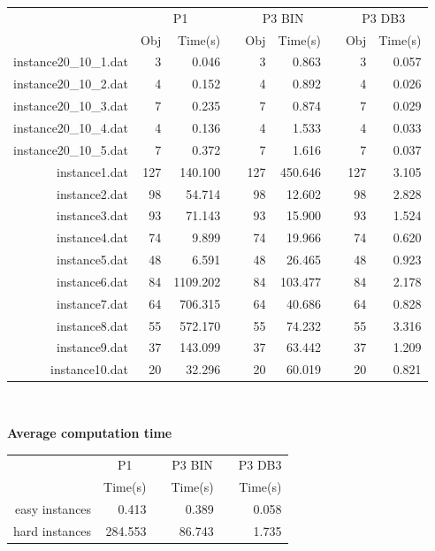 \newpage
\begin{table}[h!]\centering
{}
\begin{tabular}{@{}rrrcrrcrr@{}}\toprule
& \multicolumn{2}{c}{P1} & \phantom{abc} & \multicolumn{2}{c}{P3 BIN} & \phantom{abc} & \multicolumn{2}{c}{P3 DB3}\\
\cmidrule{2-3} \cmidrule{5-6} \cmidrule{8-9}
& Obj & Time(s) & & Obj & Time(s) & & Obj & Time(s)\\ \midrule
instance20\_10\_1.dat & 3 & 0.046 & & 3 & 0.863 & & 3 & 0.057 \\
instance20\_10\_2.dat & 4 & 0.152 & & 4 & 0.892 & & 4 & 0.026 \\
instance20\_10\_3.dat & 7 & 0.235 & & 7 & 0.874 & & 7 & 0.029 \\
instance20\_10\_4.dat & 4 & 0.136 & & 4 & 1.533 & & 4 & 0.033 \\
instance20\_10\_5.dat & 7 & 0.372 & & 7 & 1.616 & & 7 & 0.037 \\
instance1.dat & 127 & 140.100 & & 127 & 450.646 & & 127 & 3.105 \\
instance2.dat & 98 & 54.714 & & 98 & 12.602 & & 98 & 2.828 \\
instance3.dat & 93 & 71.143 & & 93 & 15.900 & & 93 & 1.524 \\
instance4.dat & 74 & 9.899 & & 74 & 19.966 & & 74 & 0.620 \\
instance5.dat & 48 & 6.591 & & 48 & 26.465 & & 48 & 0.923 \\
instance6.dat & 84 & 1109.202 & & 84 & 103.477 & & 84 & 2.178 \\
instance7.dat & 64 & 706.315 & & 64 & 40.686 & & 64 & 0.828 \\
instance8.dat & 55 & 572.170 & & 55 & 74.232 & & 55 & 3.316 \\
instance9.dat & 37 & 143.099 & & 37 & 63.442 & & 37 & 1.209 \\
instance10.dat & 20 & 32.296 & & 20 & 60.019 & & 20 & 0.821 \\
\bottomrule
\end{tabular}
\end{table}\ \\

\begin{center}
\textbf{Average computation time}
\end{center}
\begin{table}[h!]\centering
{}
\begin{tabular}{@{}rrcrcr@{}}\toprule
& \multicolumn{1}{c}{P1} & \phantom{abc} & \multicolumn{1}{c}{P3 BIN} & \phantom{abc} & \multicolumn{1}{c}{P3 DB3}\\
& Time(s) & & Time(s) & & Time(s)\\ \midrule
easy instances & 0.413 & & 0.389 & & 0.058 \\
hard instances & 284.553 & & 86.743 & & 1.735 \\
\bottomrule
\end{tabular}
\end{table}\ \\


